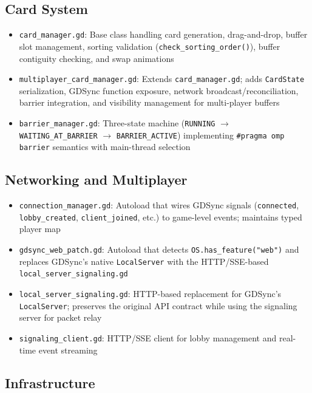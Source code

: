 \subsection{Card System}

\begin{itemize}
    \item \texttt{card\_manager.gd}: Base class handling card generation, drag-and-drop, buffer slot management, sorting validation (\texttt{check\_sorting\_order()}), buffer contiguity checking, and swap animations
    \item \texttt{multiplayer\_card\_manager.gd}: Extends \texttt{card\_manager.gd}; adds \texttt{CardState} serialization, GDSync function exposure, network broadcast/reconciliation, barrier integration, and visibility management for multi-player buffers
    \item \texttt{barrier\_manager.gd}: Three-state machine (\texttt{RUNNING} $\to$ \texttt{WAITING\_AT\_BARRIER} $\to$ \texttt{BARRIER\_ACTIVE}) implementing \texttt{\#pragma omp barrier} semantics with main-thread selection
\end{itemize}

\subsection{Networking and Multiplayer}

\begin{itemize}
    \item \texttt{connection\_manager.gd}: Autoload that wires GDSync signals (\texttt{connected}, \texttt{lobby\_created}, \texttt{client\_joined}, etc.) to game-level events; maintains typed player map
    \item \texttt{gdsync\_web\_patch.gd}: Autoload that detects \texttt{OS.has\_feature("web")} and replaces GDSync's native \texttt{LocalServer} with the HTTP/SSE-based \texttt{local\_server\_signaling.gd}
    \item \texttt{local\_server\_signaling.gd}: HTTP-based replacement for GDSync's \texttt{LocalServer}; preserves the original API contract while using the signaling server for packet relay
    \item \texttt{signaling\_client.gd}: HTTP/SSE client for lobby management and real-time event streaming
\end{itemize}

\subsection{Infrastructure}


